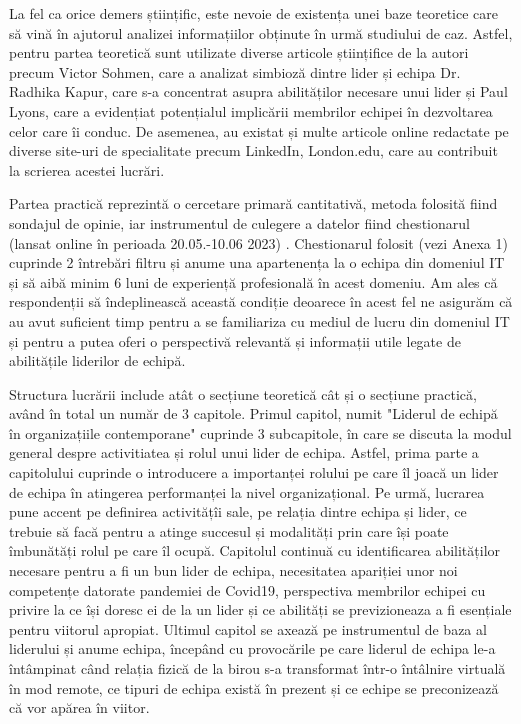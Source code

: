 \documentclass[a4paper, 12pt]{article}
\begin{document}
	\quad La fel ca orice demers științific, este nevoie de existența unei baze teoretice care să vină în ajutorul analizei informațiilor obținute în urmă studiului de caz. Astfel, pentru partea teoretică sunt utilizate diverse articole științifice de la autori precum Victor Sohmen, care a analizat simbioză dintre lider și echipa Dr. Radhika Kapur, care s-a concentrat asupra abilităților necesare unui lider și Paul Lyons, care a evidențiat potențialul implicării membrilor echipei în dezvoltarea celor care îi conduc. De asemenea, au existat și multe articole online redactate pe diverse site-uri de specialitate precum LinkedIn, London.edu, care au contribuit la scrierea acestei lucrări.

	\quad Partea practică reprezintă o cercetare primară cantitativă, metoda folosită fiind sondajul de opinie, iar instrumentul de culegere a datelor fiind chestionarul (lansat online în perioada 20.05.-10.06 2023) . Chestionarul folosit (vezi Anexa 1) cuprinde 2 întrebări filtru și anume una apartenența la o echipa din domeniul IT și să aibă minim 6 luni de experiență profesională în acest domeniu. Am ales că respondenții să îndeplinească această condiție deoarece în acest fel ne asigurăm că au avut suficient timp pentru a se familiariza cu mediul de lucru din domeniul IT și pentru a putea oferi o perspectivă relevantă și informații utile legate de abilitățile liderilor de echipă.

	\quad  Structura lucrării include atât o secțiune teoretică cât și o secțiune practică, având în total un număr de 3 capitole. Primul capitol, numit "Liderul de echipă în organizațiile contemporane" cuprinde 3 subcapitole, în care se discuta la modul general despre activitiatea și rolul unui lider de echipa. Astfel, prima parte a capitolului cuprinde o introducere a importanței rolului pe care îl joacă un lider de echipa în atingerea performanței la nivel organizațional. Pe urmă, lucrarea pune accent pe definirea activitățîi sale, pe relația dintre echipa și lider, ce trebuie să facă pentru a atinge succesul și modalități prin care își poate îmbunătăți rolul pe care îl ocupă. Capitolul continuă cu identificarea abilităților necesare pentru a fi un bun lider de echipa, necesitatea apariției unor noi competențe datorate pandemiei de Covid19, perspectiva membrilor echipei cu privire la ce își doresc ei de la un lider și ce abilități se previzioneaza a fi esențiale pentru viitorul apropiat. Ultimul capitol se axează pe instrumentul de baza al liderului și anume echipa, începând cu provocările pe care liderul de echipa le-a întâmpinat când relația fizică de la birou s-a transformat într-o întâlnire virtuală în mod remote, ce tipuri de echipa există în prezent și ce echipe se preconizează că vor apărea în viitor.
\end{document}

